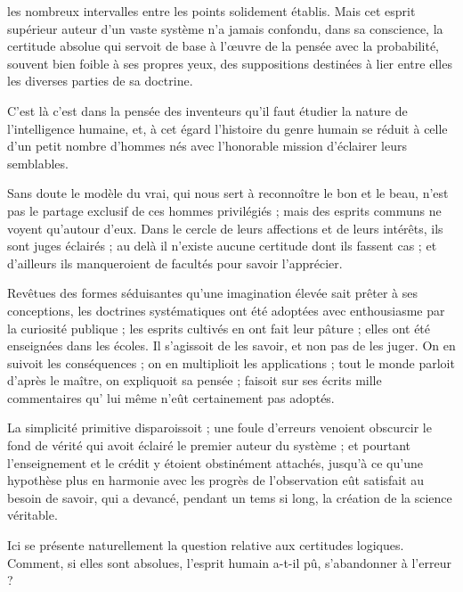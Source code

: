 \documentclass[11pt,a4paper]{article}
\begin{document}
les nombreux intervalles entre les points solidement établis. Mais cet
esprit supérieur auteur d'un vaste système n'a jamais confondu, dans sa
conscience, la certitude absolue qui servoit de base à l'œuvre de la
pensée avec la probabilité, souvent bien foible à ses propres yeux, des
suppositions destinées à lier entre elles les diverses parties de sa
doctrine.

C'est là c'est dans la pensée des inventeurs qu'il faut étudier la
nature de l'intelligence humaine, et, à cet égard l'histoire du genre humain se réduit à
celle d'un petit nombre d'hommes nés avec l'honorable mission d'éclairer
leurs semblables.

Sans doute le modèle du vrai, qui nous sert à reconnoître le bon et le
beau, n'est pas le partage exclusif de ces hommes privilégiés ; mais des
esprits communs ne voyent qu'autour d'eux. Dans le cercle de leurs
affections et de leurs intérêts, ils sont juges éclairés ; au delà il
n'existe aucune certitude dont ils fassent cas ; et d'ailleurs ils
manqueroient de facultés pour savoir l'apprécier.

Revêtues des formes séduisantes qu'une imagination élevée sait prêter à
ses conceptions, les doctrines systématiques ont été adoptées avec
enthousiasme par la curiosité publique ; les esprits cultivés en ont
fait leur pâture ; elles ont été enseignées dans les écoles. Il
s'agissoit de les savoir, et non pas de les juger. On en
suivoit les conséquences ; on en multiplioit les applications ; tout le
monde parloit d'après le maître, on expliquoit sa pensée ;
 faisoit sur ses écrits mille commentaires qu'
lui même n'eût  certainement pas adoptés.

La simplicité primitive disparoissoit ; une foule d'erreurs
venoient obscurcir le fond de vérité qui avoit éclairé le premier
auteur du système ; et pourtant l'enseignement et le crédit y étoient
obstinément attachés, jusqu'à ce qu'une hypothèse plus en harmonie avec
les progrès de l'observation eût satisfait au besoin de savoir, qui a
devancé, pendant un tems si long, la création de la science véritable.

Ici se présente naturellement la question relative aux certitudes
logiques. Comment, si elles sont absolues, l'esprit humain a-t-il pû,
s'abandonner à l'erreur ?
\end{document}
